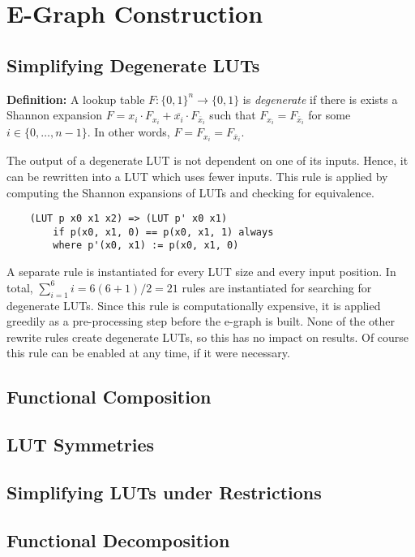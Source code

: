 \section{E-Graph Construction} \label{sec:rewrites}

\subsection{Simplifying Degenerate LUTs} \label{sec:rewrites:degen}

\textbf{Definition:} A lookup table $F : \{ 0, 1 \}^n \rightarrow \{ 0, 1 \}$ is \textit{degenerate} if there is exists a Shannon expansion $F = x_i \cdot F_{x_i} + \overline{x_i} \cdot F_{\overline{x}_i}$
such that $F_{x_i} = F_{\overline{x}_i}$ for some $i \in \{ 0, \ldots, n -1\}$. In other words, $F = F_{x_i} = F_{\overline{x}_i}$.

The output of a degenerate LUT is not dependent on one of its inputs. Hence, it
can be rewritten into a LUT which uses fewer inputs. This rule is applied by
computing the Shannon expansions of LUTs and checking for equivalence.

\begin{verbatim}
    (LUT p x0 x1 x2) => (LUT p' x0 x1)
        if p(x0, x1, 0) == p(x0, x1, 1) always
        where p'(x0, x1) := p(x0, x1, 0)
\end{verbatim}

A separate rule is instantiated for every LUT size and every input position. In
total, $\sum_{i=1}^{6} i = 6(6+1)/2 = 21$ rules are instantiated for searching
for degenerate LUTs. Since this rule is computationally expensive, it is
applied greedily as a pre-processing step before the e-graph is built. None of
the other rewrite rules create degenerate LUTs, so this has no impact on
results. Of course this rule can be enabled at any time, if it were necessary.

\subsection{Functional Composition}  \label{sec:rewrites:composition}

\subsection{LUT Symmetries} \label{sec:rewrites:symmetry}

\subsection{Simplifying LUTs under Restrictions} \label{sec:rewrites:restrict}

\subsection{Functional Decomposition} \label{sec:rewrites:decomp}
